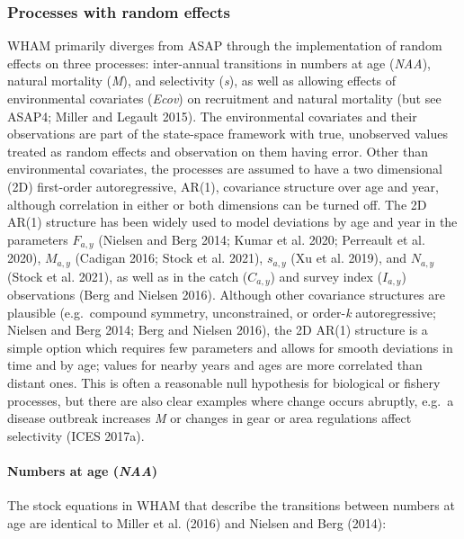 \documentclass[]{article}
\let\oldparagraph\paragraph
\renewcommand{\paragraph}[1]{\oldparagraph{#1}\mbox{}}
\begin{document}
\hypertarget{processes-with-random-effects}{%
\subsubsection{Processes with random
effects}\label{processes-with-random-effects}}

WHAM primarily diverges from ASAP through the implementation of random
effects on three processes: inter-annual transitions in numbers at age
(\emph{NAA}), natural mortality (\emph{M}), and selectivity (\emph{s}),
as well as allowing effects of environmental covariates (\emph{Ecov}) on
recruitment and natural mortality (but see ASAP4; Miller and Legault
2015). The environmental covariates and their observations are part of
the state-space framework with true, unobserved values treated as random
effects and observation on them having error. Other than environmental
covariates, the processes are assumed to have a two dimensional (2D)
first-order autoregressive, AR(1), covariance structure over age and
year, although correlation in either or both dimensions can be turned
off. The 2D AR(1) structure has been widely used to model deviations by
age and year in the parameters \(F_{a,y}\) (Nielsen and Berg 2014; Kumar
et al. 2020; Perreault et al. 2020), \(M_{a,y}\) (Cadigan 2016; Stock et
al. 2021), \(s_{a,y}\) (Xu et al. 2019), and \(N_{a,y}\) (Stock et al.
2021), as well as in the catch (\(C_{a,y}\)) and survey index
(\(I_{a,y}\)) observations (Berg and Nielsen 2016). Although other
covariance structures are plausible (e.g.~compound symmetry,
unconstrained, or order-\emph{k} autoregressive; Nielsen and Berg 2014;
Berg and Nielsen 2016), the 2D AR(1) structure is a simple option which
requires few parameters and allows for smooth deviations in time and by
age; values for nearby years and ages are more correlated than distant
ones. This is often a reasonable null hypothesis for biological or
fishery processes, but there are also clear examples where change occurs
abruptly, e.g.~a disease outbreak increases \emph{M} or changes in gear
or area regulations affect selectivity (ICES 2017a).

\hypertarget{numbers-at-age-naa}{%
\paragraph{\texorpdfstring{Numbers at age
(\emph{NAA})}{Numbers at age (NAA)}}\label{numbers-at-age-naa}}

The stock equations in WHAM that describe the transitions between
numbers at age are identical to Miller et al. (2016) and Nielsen and
Berg (2014):
\end{document}
